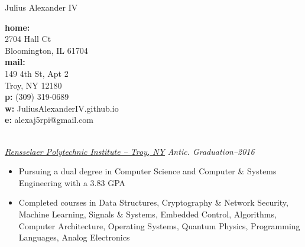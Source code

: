 \documentclass[11pt]{article} %
\begin{document}
\title{}
\centerline{ {\Huge \sc Julius Alexander IV} }

\begin{multicols}{3}
\noindent \textbf{home:} \\
2704 Hall Ct \\
Bloomington, IL 61704 \\

\noindent \textbf{mail:} \\
149 4th St, Apt 2 \\
Troy, NY 12180 \\

\noindent \textbf{p:} (309) 319-0689 \\
\noindent \textbf{w:} JuliusAlexanderIV.github.io \\
\noindent \textbf{e:} alexaj5rpi@gmail.com
\end{multicols}


 \hrulefill\\
\noindent
\underline{\textit{Rensselaer Polytechnic Institute -- Troy, NY}} \hfill \textit{Antic. Graduation--2016}

\begin{itemize}[noitemsep]
\renewcommand\labelitemi{$\circ$}

\item Pursuing a dual degree in Computer Science and Computer \& Systems Engineering with a 3.83 GPA
\item Completed courses in Data Structures, Cryptography \& Network Security, Machine Learning, Signals \& Systems, Embedded Control, Algorithms, Computer Architecture, Operating Systems, Quantum Physics, Programming Languages, Analog Electronics
\end{itemize}

\end{document}
